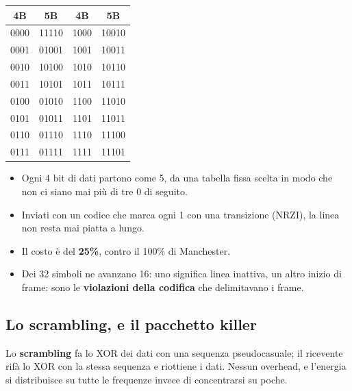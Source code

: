 \begin{minipage}{0.42\linewidth}
\centering\small
\begin{tabular}{cc|cc}
\toprule
\textbf{4B} & \textbf{5B} & \textbf{4B} & \textbf{5B} \\
\midrule
0000 & 11110 & 1000 & 10010 \\
0001 & 01001 & 1001 & 10011 \\
0010 & 10100 & 1010 & 10110 \\
0011 & 10101 & 1011 & 10111 \\
0100 & 01010 & 1100 & 11010 \\
0101 & 01011 & 1101 & 11011 \\
0110 & 01110 & 1110 & 11100 \\
0111 & 01111 & 1111 & 11101 \\
\bottomrule
\end{tabular}
\end{minipage}\hfill
\begin{minipage}{0.55\linewidth}
\begin{itemize}
    \item Ogni 4 bit di dati partono come 5, da una tabella fissa scelta in modo che non ci siano mai più di tre 0 di seguito.
    \item Inviati con un codice che marca ogni 1 con una transizione (NRZI), la linea non resta mai piatta a lungo.
    \item Il costo è del \textbf{25\%}, contro il 100\% di Manchester.
    \item Dei 32 simboli ne avanzano 16: uno significa linea inattiva, un altro inizio di frame: sono le \textbf{violazioni della
          codifica} che delimitavano i frame.
\end{itemize}
\end{minipage}

\subsection{Lo scrambling, e il pacchetto killer}

Lo \textbf{scrambling} fa lo XOR dei dati con una sequenza pseudocasuale; il ricevente rifà lo XOR con la stessa sequenza e riottiene
i dati. Nessun overhead, e l'energia si distribuisce su tutte le frequenze invece di concentrarsi su poche.


